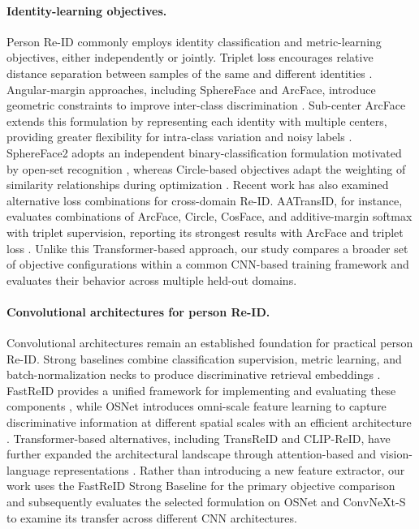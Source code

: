 \documentclass{llncs}
\begin{document}
\paragraph{Identity-learning objectives.}
Person Re-ID commonly employs identity classification and metric-learning objectives, either independently or jointly. Triplet loss encourages relative distance separation between samples of the same and different identities \cite{hermans2017triplet}. Angular-margin approaches, including SphereFace and ArcFace, introduce geometric constraints to improve inter-class discrimination \cite{liu2017sphereface,deng2019arcface}. Sub-center ArcFace extends this formulation by representing each identity with multiple centers, providing greater flexibility for intra-class variation and noisy labels \cite{deng2020subcenter}. SphereFace2 adopts an independent binary-classification formulation motivated by open-set recognition \cite{wen2022sphereface2}, whereas Circle-based objectives adapt the weighting of similarity relationships during optimization \cite{sun2020circle,song2020strong}. Recent work has also examined alternative loss combinations for cross-domain Re-ID. AATransID, for instance, evaluates combinations of ArcFace, Circle, CosFace, and additive-margin softmax with triplet supervision, reporting its strongest results with ArcFace and triplet loss \cite{yildiz2026aatransid}. Unlike this Transformer-based approach, our study compares a broader set of objective configurations within a common CNN-based training framework and evaluates their behavior across multiple held-out domains.

\paragraph{Convolutional architectures for person Re-ID.}
Convolutional architectures remain an established foundation for practical person Re-ID. Strong baselines combine classification supervision, metric learning, and batch-normalization necks to produce discriminative retrieval embeddings \cite{luo2019bag,sun2018beyond,song2020strong}. FastReID provides a unified framework for implementing and evaluating these components \cite{he2023fastreid}, while OSNet introduces omni-scale feature learning to capture discriminative information at different spatial scales with an efficient architecture \cite{zhou2022learning}. Transformer-based alternatives, including TransReID and CLIP-ReID, have further expanded the architectural landscape through attention-based and vision-language representations \cite{he2021transreid,li2023clip}. Rather than introducing a new feature extractor, our work uses the FastReID Strong Baseline for the primary objective comparison and subsequently evaluates the selected formulation on OSNet and ConvNeXt-S to examine its transfer across different CNN architectures.
\end{document}
